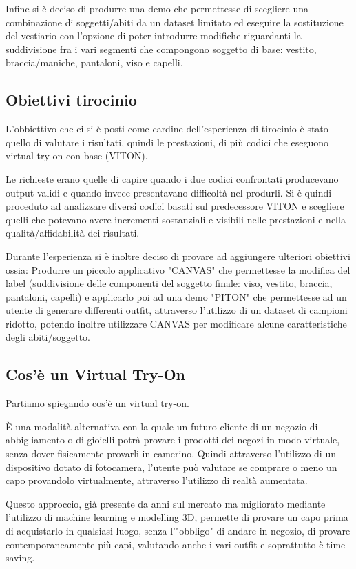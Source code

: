 \documentclass[final, 11pt]{article}
\begin{document}
	Infine si è deciso di produrre una demo che permettesse di scegliere una combinazione di soggetti/abiti da un dataset limitato ed eseguire la sostituzione del vestiario con l’opzione di poter introdurre modifiche riguardanti la suddivisione fra i vari segmenti che compongono soggetto di base: vestito, braccia/maniche, pantaloni, viso e capelli.
	
	\subsection {Obiettivi tirocinio}
	L'obbiettivo che ci si è posti come cardine dell'esperienza di tirocinio è stato quello di valutare i risultati, quindi le prestazioni, di più codici che eseguono virtual try-on con base (VITON).
	
	Le richieste erano quelle di capire quando i due codici confrontati producevano output validi e quando invece presentavano difficoltà nel produrli.
	Si è quindi proceduto ad analizzare diversi codici basati sul predecessore VITON e scegliere quelli che potevano avere incrementi sostanziali e visibili nelle prestazioni e nella qualità/affidabilità dei risultati.
	
	Durante l'esperienza si è inoltre deciso di provare ad aggiungere ulteriori obiettivi ossia: Produrre un piccolo applicativo "CANVAS" che permettesse la modifica del label (suddivisione delle componenti del soggetto finale: viso, vestito, braccia, pantaloni, capelli) e applicarlo poi ad una demo "PITON" che permettesse ad un utente di generare differenti outfit, attraverso l'utilizzo di un dataset di campioni ridotto, potendo inoltre utilizzare CANVAS per modificare alcune caratteristiche degli abiti/soggetto.
	
	
	
	\subsection{Cos'è un Virtual Try-On}
	Partiamo spiegando cos'è un virtual try-on. 
	
	È una modalità alternativa con la quale un futuro cliente di un negozio di abbigliamento o di gioielli potrà provare i prodotti dei negozi in modo virtuale, senza dover fisicamente provarli in camerino. Quindi attraverso l'utilizzo di un dispositivo dotato di fotocamera, l'utente può valutare se comprare o meno un capo provandolo virtualmente, attraverso l'utilizzo di realtà aumentata.
	
	Questo approccio, già presente da anni sul mercato ma migliorato mediante l'utilizzo di machine learning
e modelling 3D, permette di provare un capo prima di acquistarlo in qualsiasi luogo, senza l'"obbligo" di andare in negozio, di provare contemporaneamente più capi, valutando anche i vari outfit e soprattutto è time-saving.
	
\end{document}
